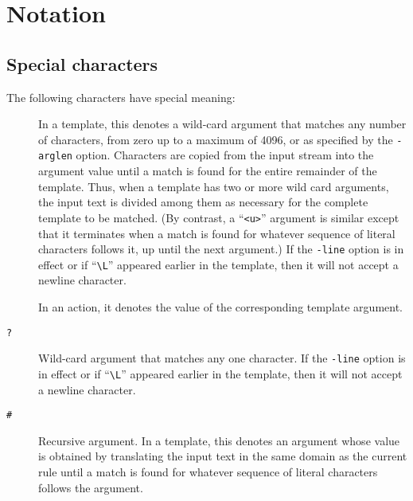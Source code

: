 
\section{Notation}

\subsection{Special characters}
The following characters have special meaning:

\begin{description}
\item[{\tt *}]
In a template, this denotes a wild-card argument that matches any number
of characters, from zero up to a maximum of 4096, or as specified by the
\verb/-arglen/ option.
Characters are copied from the input stream into the argument value
until a match is found for the entire remainder of the template.
Thus, when a template has two or more wild card arguments, the input text is
divided among them as necessary for the complete template to be matched.
(By contrast, a ``\verb/<u>/'' argument is similar except that it
terminates when a match is found for whatever sequence of literal
characters follows it, up until the next argument.)
If the \verb/-line/ option is in effect or if ``\verb/\L/'' appeared
earlier in the template, then it will not accept a newline character.

In an action, it denotes the value of the corresponding
template argument.
\item[{\tt ?}]
Wild-card argument that matches any one character.
If the \verb/-line/ option is in effect or if ``\verb/\L/'' appeared
earlier in the template, then it will not accept a newline character.
\item[{\tt \#}]
Recursive argument.
In a template, this denotes an argument whose value is obtained by
translating the input text in the same domain as the current rule until
a match is found for whatever sequence of literal characters follows the
argument.


\end{description}
